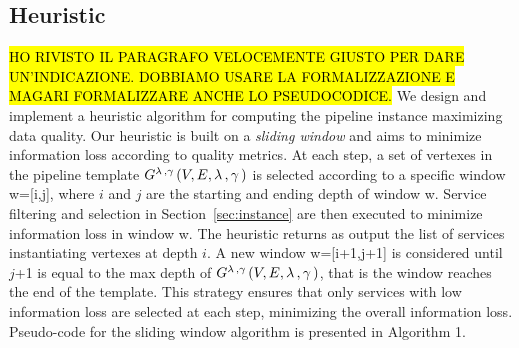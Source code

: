     \subsection{Heuristic}\label{subsec:heuristics}
    \hl{HO RIVISTO IL PARAGRAFO VELOCEMENTE GIUSTO PER DARE UN'INDICAZIONE. DOBBIAMO USARE LA FORMALIZZAZIONE E MAGARI FORMALIZZARE ANCHE LO PSEUDOCODICE.} We design and implement a heuristic algorithm for computing the pipeline instance maximizing data quality. Our heuristic is built on a \emph{sliding window} and aims to minimize information loss according to quality metrics. At each step, a set of vertexes in the pipeline template $G^{\lambda\,,\gamma\,}(V,E,\lambda\,,\gamma\,)$ is selected according to a specific window w=[i,j], where $i$ and $j$ are the starting and ending depth of window w. Service filtering and selection in Section~\ref{sec:instance} are then executed to minimize information loss in window w. The heuristic returns as output the list of services instantiating vertexes at depth $i$. A new window w=[i+1,j+1] is considered until $j$+1 is equal to the max depth of $G^{\lambda\,,\gamma\,}(V,E,\lambda\,,\gamma\,)$, that is the window reaches the end of the template.
This strategy ensures that only services with low information loss are selected at each step, minimizing the overall information loss. Pseudo-code for the sliding window algorithm is presented in Algorithm 1.

